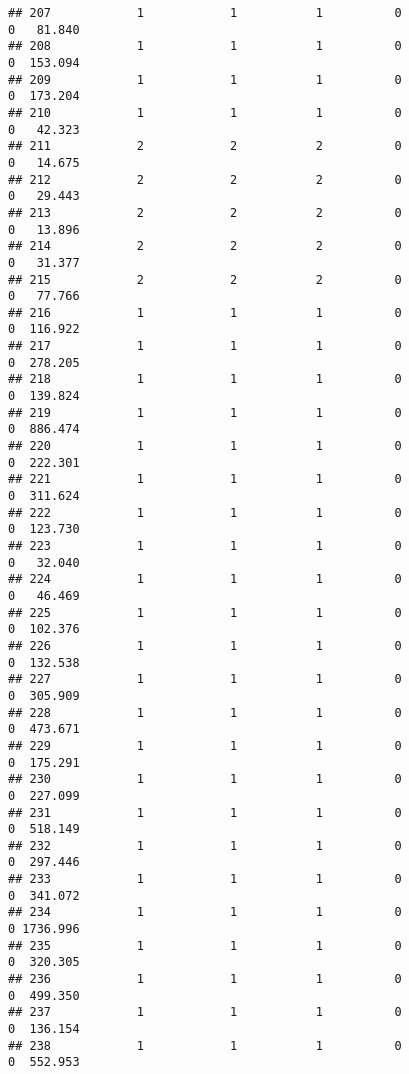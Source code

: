 \documentclass[
]{article}
\begin{document}
\begin{verbatim}
## 207            1            1           1          0                0   81.840
## 208            1            1           1          0                0  153.094
## 209            1            1           1          0                0  173.204
## 210            1            1           1          0                0   42.323
## 211            2            2           2          0                0   14.675
## 212            2            2           2          0                0   29.443
## 213            2            2           2          0                0   13.896
## 214            2            2           2          0                0   31.377
## 215            2            2           2          0                0   77.766
## 216            1            1           1          0                0  116.922
## 217            1            1           1          0                0  278.205
## 218            1            1           1          0                0  139.824
## 219            1            1           1          0                0  886.474
## 220            1            1           1          0                0  222.301
## 221            1            1           1          0                0  311.624
## 222            1            1           1          0                0  123.730
## 223            1            1           1          0                0   32.040
## 224            1            1           1          0                0   46.469
## 225            1            1           1          0                0  102.376
## 226            1            1           1          0                0  132.538
## 227            1            1           1          0                0  305.909
## 228            1            1           1          0                0  473.671
## 229            1            1           1          0                0  175.291
## 230            1            1           1          0                0  227.099
## 231            1            1           1          0                0  518.149
## 232            1            1           1          0                0  297.446
## 233            1            1           1          0                0  341.072
## 234            1            1           1          0                0 1736.996
## 235            1            1           1          0                0  320.305
## 236            1            1           1          0                0  499.350
## 237            1            1           1          0                0  136.154
## 238            1            1           1          0                0  552.953

\end{verbatim}
\end{document}
